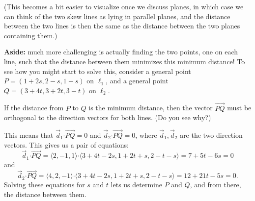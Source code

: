 \documentclass[12pt]{article}
\newcommand{\dotp}{\boldsymbol{\cdot}}
\begin{document}
\begin{enumerate}
(This becomes a bit easier to visualize once we discuss planes, in which case we can think of the two skew lines as lying in parallel planes, and the distance between the two lines is then the same as the distance between the two planes containing them.)

\bigskip

\bigskip

\textbf{Aside:} much more challenging is actually finding the two points, one on each line, such that the distance between them minimizes this minimum distance! To see how you might start to solve this, consider a general point $P = (1+2s,2-s,1+s)$ on $\ell_1$, and a general point $Q=(3+4t,3+2t,3-t)$ on $\ell_2$.

If the distance from $P$ to $Q$ is the minimum distance, then the vector $\overrightarrow{PQ}$ must be orthogonal to the direction vectors for both lines. (Do you see why?)

This means that $\vec{d}_1\dotp \overrightarrow{PQ}=0$ and $\vec{d}_2\dotp \overrightarrow{PQ}=0$, where $\vec{d}_1,\vec{d}_2$ are the two direction vectors. This gives us a pair of equations:
\[
\vec{d}_1\dotp \overrightarrow{PQ} = \langle 2,-1,1\rangle\dotp \langle 3+4t-2s, 1+2t+s, 2-t-s\rangle = 7+5t-6s=0
\]
and
\[
\vec{d}_2\dotp \overrightarrow{PQ} = \langle 4,2,-1\rangle\dotp \langle 3+4t-2s, 1+2t+s, 2-t-s\rangle = 12+21t-5s=0.
\]
Solving these equations for $s$ and $t$ lets us determine $P$ and $Q$, and from there, the distance between them.


\end{enumerate}
  
\end{document}
